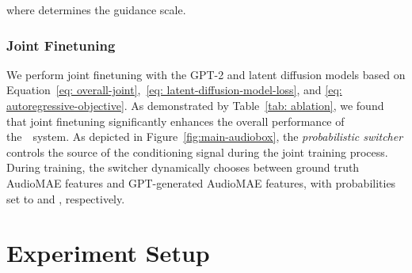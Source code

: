 \documentclass[lettersize,journal]{IEEEtran}
\begin{document}
where  determines the guidance scale.



\subsubsection{Joint Finetuning}

\label{sec: joint-training}
We perform joint finetuning with the GPT-2 and latent diffusion models based on Equation~\eqref{eq: overall-joint},~\eqref{eq: latent-diffusion-model-loss}, and \eqref{eq: autoregressive-objective}. As demonstrated by Table~\ref{tab: ablation}, we found that joint finetuning significantly enhances the overall performance of the~\vModelName~system. As depicted in Figure~\ref{fig:main-audiobox}, the \textit{probabilistic switcher} controls the source of the conditioning signal during the joint training process. During training, the switcher dynamically chooses between ground truth AudioMAE features and GPT-generated AudioMAE features, with probabilities set to  and , respectively.

\section{Experiment Setup}
\end{document}
